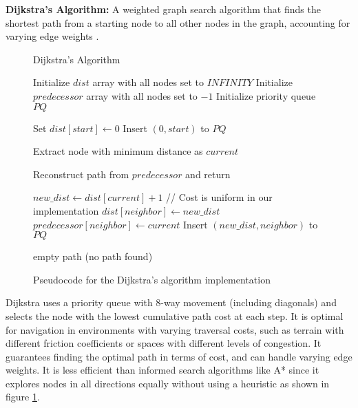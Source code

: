 \documentclass{CSSRforAfrica}
\begin{document}
\noindent \textbf{Dijkstra's Algorithm:} A weighted graph search algorithm that finds the shortest path from a starting node to all other nodes in the graph, accounting for varying edge weights \cite{Dijkstra1959}.
\begin{figure}[H]
	\centering
	\begin{minipage}{0.8\textwidth}
		\begin{algorithm}[H]
			\caption{Dijkstra's Algorithm}
			\begin{algorithmic}[1]
				\State Initialize $dist$ array with all nodes set to $INFINITY$
				\State Initialize $predecessor$ array with all nodes set to $-1$
				\State Initialize priority queue $PQ$
				
				\State Set $dist[start] \gets 0$
				\State Insert $(0, start)$ to $PQ$
				
				\State Extract node with minimum distance as $current$
				
				\State Reconstruct path from $predecessor$ and return
				\EndIf
				
				\State $new\_dist \gets dist[current] + 1$  // Cost is uniform in our implementation
				\State $dist[neighbor] \gets new\_dist$
				\State $predecessor[neighbor] \gets current$
				\State Insert $(new\_dist, neighbor)$ to $PQ$
				\EndIf
				\EndFor
				\EndWhile
				
				\State \Return empty path (no path found)
				\EndFunction
			\end{algorithmic}
		\end{algorithm}
	\end{minipage}
	\caption{Pseudocode for the Dijkstra's algorithm implementation}
	\label{alg:dijkstra}
\end{figure}


\noindent Dijkstra uses a priority queue with 8-way movement (including diagonals) and selects the node with the lowest cumulative path cost at each step. It is optimal for navigation in environments with varying traversal costs, such as terrain with different friction coefficients or spaces with different levels of congestion. It guarantees finding the optimal path in terms of cost, and can handle varying edge weights. It is less efficient than informed search algorithms like A* since it explores nodes in all directions equally without using a heuristic as shown in figure \ref{alg:dijkstra}.\\
\end{document}
